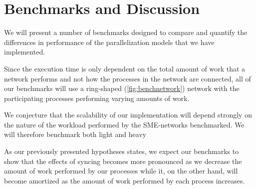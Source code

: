 \chapter{Benchmarks and Discussion}

We will present a number of benchmarks designed to compare and
quantify the differences in performance of the parallelization models
that we have implemented.

Since the execution time is only dependent on the total amount of work
that a network performs and not how the processes in the network are
connected, all of our benchmarks will use a ring-shaped
(\cref{fig:benchnetwork}) network with the participating processes
performing varying amounts of work.

We conjecture that the scalability of our implementation will depend
strongly on the nature of the workload performed by the SME-networks
benchmarked. We will therefore benchmark both light and heavy

As our previously presented hypotheses states, we expect our
benchmarks to show that the effects of syncing becomes more pronounced
as we decrease the amount of work performed by our processes while it,
on the other hand, will become amortized as the amount of work
performed by each process increases.

